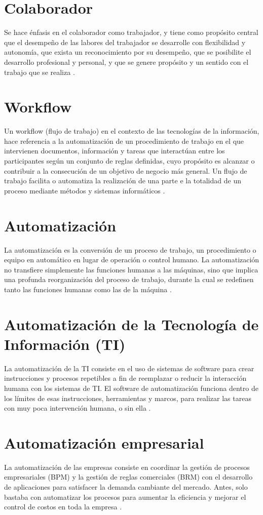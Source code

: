 \section{Colaborador}
Se hace énfasis en el colaborador como trabajador, y tiene como propósito central que el desempeño de las labores
del trabajador se desarrolle con flexibilidad y autonomía, que exista un reconocimiento por su desempeño, que se posibilite el desarrollo profesional y personal, y que se genere propósito y un sentido con el trabajo que se realiza \citet{Diaz2018}.
\section{Workflow}
Un workflow (flujo de trabajo) en el contexto de las tecnologías de la información, hace referencia a la automatización de un procedimiento de trabajo en el que intervienen documentos, información y tareas que interactúan entre los participantes según un conjunto de reglas definidas, cuyo propósito es alcanzar o contribuir a la consecución de un objetivo de negocio más general. Un flujo de trabajo facilita o automatiza la realización de una parte e la totalidad de un proceso mediante métodos y sistemas informáticos \citep{Hollingsworth1995}.
\section{Automatización}
La automatización es la conversión de un proceso de trabajo, un procedimiento o equipo en automático en lugar
de operación o control humano. La automatización no transfiere simplemente las funciones humanas a las máquinas, sino que
implica una profunda reorganización del proceso de trabajo, durante la cual se redefinen tanto las funciones humanas como las de la máquina \citep{Gerovitch2020}.
\section{Automatización de la Tecnología de Información (TI)}
La automatización de la TI consiste en el uso de sistemas de software para crear instrucciones y procesos repetibles a fin de reemplazar o reducir la interacción humana con los sistemas de TI. El software de automatización funciona dentro de los límites de esas instrucciones, herramientas y marcos, para realizar las tareas con muy poca intervención humana, o sin ella \citep{RedHat2018}.
\section{Automatización empresarial}
La automatización de las empresas consiste en coordinar la gestión de procesos empresariales
(BPM) y la gestión de reglas comerciales (BRM) con el desarrollo de aplicaciones para satisfacer la demanda cambiante del
mercado. Antes, solo bastaba con automatizar los procesos para aumentar la eficiencia y mejorar el control de costos en toda la empresa \citep{RedHat2018}.

